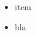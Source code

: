 \documentclass{beamer}
\begin{document}
\begin{frame}

\begin{itemize}[<+->]
\item item
\item bla
\end{itemize}
\end{frame} 
\end{document}
